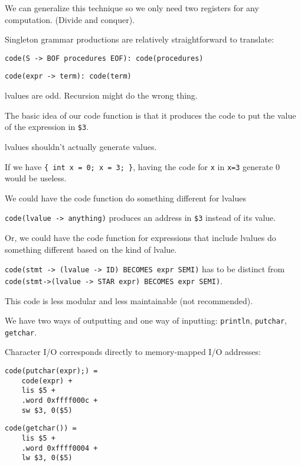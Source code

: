 \documentclass{article}
\begin{document}
We can generalize this technique so we only need two registers for any
computation. (Divide and conquer).

Singleton grammar productions are relatively straightforward to
translate:

\texttt{code(S -\textgreater{} BOF procedures EOF): code(procedures)}

\texttt{code(expr\ -\textgreater{}\ term):\ code(term)}

lvalues are odd. Recursion might do the wrong thing.

The basic idea of our code function is that it produces the code to put
the value of the expression in \texttt{\$3}.

lvalues shouldn't actually generate values.

If we have \texttt{\{\ int\ x\ =\ 0;\ x\ =\ 3;\ \}}, having the code for
\texttt{x} in \texttt{x=3} generate 0 would be useless.

We could have the code function do something different for lvalues

\texttt{code(lvalue\ -\textgreater{}\ anything)} produces an address in
\texttt{\$3} instead of its value.

Or, we could have the code function for expressions that include lvalues
do something different based on the kind of lvalue.

\texttt{code(stmt\ -\textgreater{}\ (lvalue\ -\textgreater{}\ ID)\ BECOMES\ expr\ SEMI)}
has to be distinct from
\texttt{code(stmt-\textgreater{}(lvalue\ -\textgreater{}\ STAR\ expr)\ BECOMES\ expr\ SEMI)}.

This code is less modular and less maintainable (not recommended).

We have two ways of outputting and one way of inputting:
\texttt{println}, \texttt{putchar}, \texttt{getchar}.

Character I/O corresponds directly to memory-mapped I/O addresses:

\begin{tcolorbox}
\begin{verbatim}
code(putchar(expr);) = 
    code(expr) + 
    lis $5 + 
    .word 0xffff000c +
    sw $3, 0($5)    
\end{verbatim}
\end{tcolorbox}

\begin{tcolorbox}
\begin{verbatim}
code(getchar()) = 
    lis $5 + 
    .word 0xffff0004 +
    lw $3, 0($5)
\end{verbatim}
\end{tcolorbox}
\end{document}
